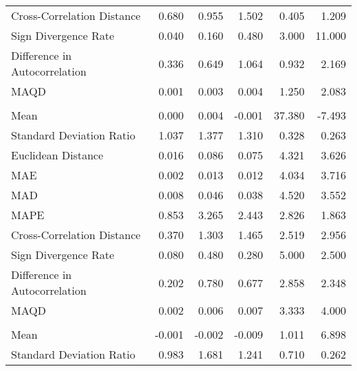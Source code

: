 \begin{landscape}
\begin{ThreePartTable}
\begin{longtable}[t]{lrrrrr}
\hspace{1em}Cross-Correlation Distance & 0.680 & 0.955 & 1.502 & 0.405 & 1.209\\
\hspace{1em}Sign Divergence Rate & 0.040 & 0.160 & 0.480 & 3.000 & 11.000\\
\hspace{1em}Difference in Autocorrelation & 0.336 & 0.649 & 1.064 & 0.932 & 2.169\\
\hspace{1em}MAQD & 0.001 & 0.003 & 0.004 & 1.250 & 2.083\\
\addlinespace[0.5em]
\multicolumn{6}{l}{\textbf{GRC}}\\
\hline
\hspace{1em}Mean & 0.000 & 0.004 & -0.001 & 37.380 & -7.493\\
\hspace{1em}Standard Deviation Ratio & 1.037 & 1.377 & 1.310 & 0.328 & 0.263\\
\hspace{1em}Euclidean Distance & 0.016 & 0.086 & 0.075 & 4.321 & 3.626\\
\hspace{1em}MAE & 0.002 & 0.013 & 0.012 & 4.034 & 3.716\\
\hspace{1em}MAD & 0.008 & 0.046 & 0.038 & 4.520 & 3.552\\
\hspace{1em}MAPE & 0.853 & 3.265 & 2.443 & 2.826 & 1.863\\
\hspace{1em}Cross-Correlation Distance & 0.370 & 1.303 & 1.465 & 2.519 & 2.956\\
\hspace{1em}Sign Divergence Rate & 0.080 & 0.480 & 0.280 & 5.000 & 2.500\\
\hspace{1em}Difference in Autocorrelation & 0.202 & 0.780 & 0.677 & 2.858 & 2.348\\
\hspace{1em}MAQD & 0.002 & 0.006 & 0.007 & 3.333 & 4.000\\
\addlinespace[0.5em]
\multicolumn{6}{l}{\textbf{HKG}}\\
\hline
\hspace{1em}Mean & -0.001 & -0.002 & -0.009 & 1.011 & 6.898\\
\hspace{1em}Standard Deviation Ratio & 0.983 & 1.681 & 1.241 & 0.710 & 0.262\\

\end{longtable}
\end{ThreePartTable}
\end{landscape}
